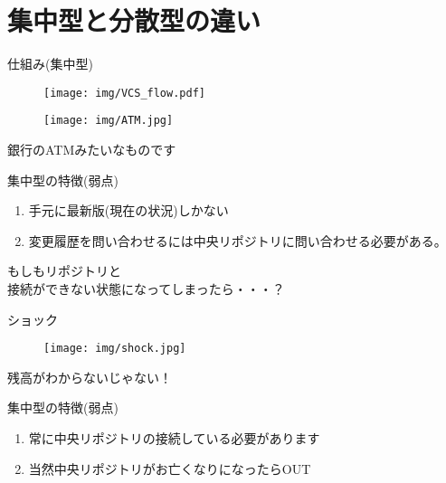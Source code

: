 \documentclass[dvipdfmx]{beamer}
\begin{document}
\section{集中型と分散型の違い}
\begin{frame}{仕組み(集中型)}
\begin{center}
\begin{figure}
\texttt{[image: img/VCS\_flow.pdf]}
\end{figure}
\end{center}
\end{frame}


\begin{frame}{}
\begin{center}
\begin{figure}
\texttt{[image: img/ATM.jpg]}
\end{figure}
\end{center}
\vspace{1cm}
\color{green}\huge{銀行のATMみたいなものです}
\end{frame}

\begin{frame}{集中型の特徴(弱点)}
\begin{enumerate}
\item 手元に最新版(現在の状況)しかない
\pause
\vspace{1.5cm}
\item 変更履歴を問い合わせるには中央リポジトリに問い合わせる必要がある。
\end{enumerate}
\end{frame}

\begin{frame}
\Huge{\alert{もしもリポジトリと\\
接続ができない状態になってしまったら・・・？}}
\end{frame}

\begin{frame}{ショック}
\begin{center}
\begin{figure}
\texttt{[image: img/shock.jpg]}
\end{figure}
\end{center}
\vspace{-7cm}
\alert{\huge{残高がわからないじゃない！}}
\end{frame}

\begin{frame}{集中型の特徴(弱点)}
\begin{enumerate}
\item \huge{常に中央リポジトリの接続している必要があります}
\pause
\vspace{1cm}
\item \huge{当然中央リポジトリがお亡くなりになったら\alert{OUT}}
\end{enumerate}
\end{frame}
\end{document}

